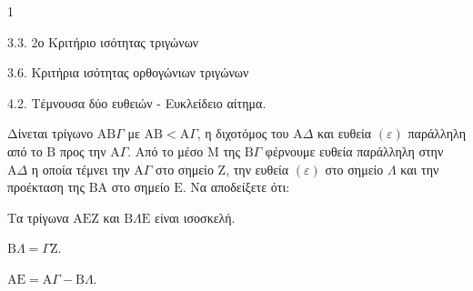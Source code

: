 \begin{ylh}{1}
    \item 3.3. 2ο Κριτήριο ισότητας τριγώνων
    \item 3.6. Κριτήρια ισότητας ορθογώνιων τριγώνων
    \item 4.2. Τέμνουσα δύο ευθειών - Ευκλείδειο αίτημα.
\end{ylh}
Δίνεται τρίγωνο $\mathrm{A}\mathrm{B}\Gamma$ με $\mathrm{A}\mathrm{B} < \mathrm{A}\Gamma$, η διχοτόμος του $\mathrm{A}\Delta$ και ευθεία $(\varepsilon)$ παράλληλη από το $\mathrm{B}$ προς την $\mathrm{A}\Gamma$. Από το μέσο $\mathrm{M}$ της $\mathrm{B}\Gamma$ φέρνουμε ευθεία παράλληλη στην $\mathrm{A}\Delta$ η οποία τέμνει την $\mathrm{A}\Gamma$ στο σημείο $\mathrm{Z}$, την ευθεία $(\varepsilon)$ στο σημείο $\Lambda$ και την προέκταση της $\mathrm{B}\mathrm{A}$ στο σημείο $\mathrm{E}$.
Να αποδείξετε ότι:
\begin{alist}
    \item Τα τρίγωνα $\mathrm{A}\mathrm{E}\mathrm{Z}$ και $\mathrm{B}\Lambda\mathrm{E}$ είναι ισοσκελή. 
    \item $\mathrm{B}\Lambda = \Gamma\mathrm{Z}$. 
    \item $\mathrm{A}\mathrm{E} = \mathrm{A}\Gamma - \mathrm{B}\Lambda$. 
\end{alist}
